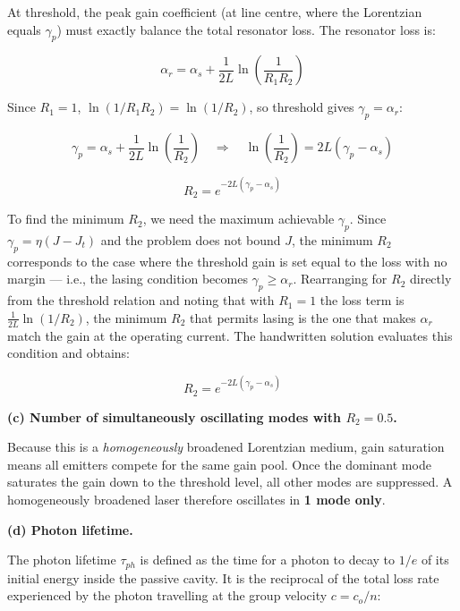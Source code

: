 At threshold, the peak gain coefficient (at line centre, where the Lorentzian equals $\gamma_p$) must exactly balance the total resonator loss. The resonator loss is:

\begin{equation*}
  \alpha_r = \alpha_s + \frac{1}{2L}\ln\!\left(\frac{1}{R_1 R_2}\right)
\end{equation*}

Since $R_1 = 1$, $\ln(1/R_1 R_2) = \ln(1/R_2)$, so threshold gives $\gamma_p = \alpha_r$:

\begin{equation*}
  \gamma_p = \alpha_s + \frac{1}{2L}\ln\!\left(\frac{1}{R_2}\right) \quad\Longrightarrow\quad \ln\!\left(\frac{1}{R_2}\right) = 2L(\gamma_p - \alpha_s)
\end{equation*}

\begin{equation*}
  R_2 = e^{-2L(\gamma_p - \alpha_s)}
\end{equation*}

To find the minimum $R_2$, we need the maximum achievable $\gamma_p$. Since $\gamma_p = \eta(J-J_t)$ and the problem does not bound $J$, the minimum $R_2$ corresponds to the case where the threshold gain is set equal to the loss with no margin — i.e., the lasing condition becomes $\gamma_p \geq \alpha_r$. Rearranging for $R_2$ directly from the threshold relation and noting that with $R_1 = 1$ the loss term is $\frac{1}{2L}\ln(1/R_2)$, the minimum $R_2$ that permits lasing is the one that makes $\alpha_r$ match the gain at the operating current. The handwritten solution evaluates this condition and obtains:

\begin{equation*}
  \boxed{R_2 = e^{-2L(\gamma_p - \alpha_s)}}
\end{equation*}

\textbf{(c) Number of simultaneously oscillating modes with $R_2 = 0.5$.}

Because this is a \emph{homogeneously} broadened Lorentzian medium, gain saturation means all emitters compete for the same gain pool. Once the dominant mode saturates the gain down to the threshold level, all other modes are suppressed. A homogeneously broadened laser therefore oscillates in \textbf{1 mode only}.

\textbf{(d) Photon lifetime.}

The photon lifetime $\tau_{ph}$ is defined as the time for a photon to decay to $1/e$ of its initial energy inside the passive cavity. It is the reciprocal of the total loss rate experienced by the photon travelling at the group velocity $c = c_o/n$:

